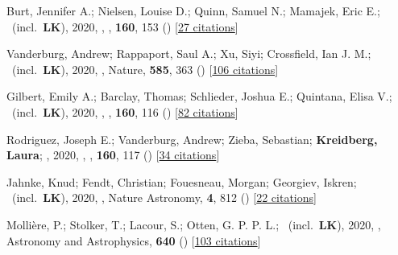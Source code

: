 \item[{\color{numcolor}\scriptsize41}] Burt, Jennifer A.; Nielsen, Louise D.; Quinn, Samuel N.; Mamajek, Eric E.; \etal\ (incl.\ \textbf{LK}), 2020, , \aj, \textbf{160}, 153 () [\href{https://ui.adsabs.harvard.edu/abs/2020AJ....160..153B}{27 citations}]

\item[{\color{numcolor}\scriptsize40}] Vanderburg, Andrew; Rappaport, Saul A.; Xu, Siyi; Crossfield, Ian J. M.; \etal\ (incl.\ \textbf{LK}), 2020, , Nature, \textbf{585}, 363 () [\href{https://ui.adsabs.harvard.edu/abs/2020Natur.585..363V}{106 citations}]

\item[{\color{numcolor}\scriptsize39}] Gilbert, Emily A.; Barclay, Thomas; Schlieder, Joshua E.; Quintana, Elisa V.; \etal\ (incl.\ \textbf{LK}), 2020, , \aj, \textbf{160}, 116 () [\href{https://ui.adsabs.harvard.edu/abs/2020AJ....160..116G}{82 citations}]

\item[{\color{numcolor}\scriptsize38}] Rodriguez, Joseph E.; Vanderburg, Andrew; Zieba, Sebastian; \textbf{Kreidberg, Laura}; \etal, 2020, , \aj, \textbf{160}, 117 () [\href{https://ui.adsabs.harvard.edu/abs/2020AJ....160..117R}{34 citations}]

\item[{\color{numcolor}\scriptsize37}] Jahnke, Knud; Fendt, Christian; Fouesneau, Morgan; Georgiev, Iskren; \etal\ (incl.\ \textbf{LK}), 2020, , Nature Astronomy, \textbf{4}, 812 () [\href{https://ui.adsabs.harvard.edu/abs/2020NatAs...4..812J}{22 citations}]

\item[{\color{numcolor}\scriptsize36}] Molli{\`e}re, P.; Stolker, T.; Lacour, S.; Otten, G. P. P. L.; \etal\ (incl.\ \textbf{LK}), 2020, , Astronomy and Astrophysics, \textbf{640} () [\href{https://ui.adsabs.harvard.edu/abs/2020A&A...640A.131M}{103 citations}]

